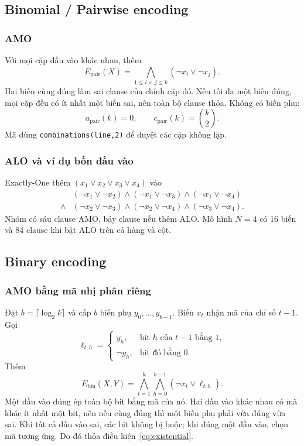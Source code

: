 \subsection{Binomial / Pairwise encoding}
\subsubsection{AMO}
Với mọi cặp đầu vào khác nhau, thêm
\begin{equation}
E_{\mathrm{pair}}(X)=
\bigwedge_{1\le i<j\le k}(\neg x_i\lor\neg x_j).
\end{equation}
Hai biến cùng đúng làm sai clause của chính cặp đó. Nếu tối đa một biến đúng, mọi cặp đều có ít nhất một biến sai, nên toàn bộ clause thỏa. Không có biến phụ:
\begin{equation}
a_{\mathrm{pair}}(k)=0,\qquad
c_{\mathrm{pair}}(k)=\binom{k}{2}.
\end{equation}
Mã dùng \texttt{combinations(line,2)} để duyệt các cặp không lặp.

\subsubsection{ALO và ví dụ bốn đầu vào}
Exactly-One thêm $(x_1\lor x_2\lor x_3\lor x_4)$ vào
\begin{align*}
&(\neg x_1\lor\neg x_2)\land(\neg x_1\lor\neg x_3)
\land(\neg x_1\lor\neg x_4)\\
{}\land{}&(\neg x_2\lor\neg x_3)\land(\neg x_2\lor\neg x_4)
\land(\neg x_3\lor\neg x_4).
\end{align*}
Nhóm có sáu clause AMO, bảy clause nếu thêm ALO. Mô hình $N=4$ có 16 biến và 84 clause khi bật ALO trên cả hàng và cột.

\subsection{Binary encoding}
\subsubsection{AMO bằng mã nhị phân riêng}
Đặt $b=\lceil\log_2 k\rceil$ và cấp $b$ biến phụ $y_0,\ldots,y_{b-1}$. Biến $x_t$ nhận mã của chỉ số $t-1$. Gọi
\begin{equation}
\ell_{t,h}=
\begin{cases}
y_h,&\text{bit }h\text{ của }t-1\text{ bằng }1,\\
\neg y_h,&\text{bit đó bằng }0.
\end{cases}
\end{equation}
Thêm
\begin{equation}
E_{\mathrm{bin}}(X,Y)=
\bigwedge_{t=1}^{k}\bigwedge_{h=0}^{b-1}
(\neg x_t\lor\ell_{t,h}).
\label{eq:binary}
\end{equation}
Một đầu vào đúng ép toàn bộ bit bằng mã của nó. Hai đầu vào khác nhau có mã khác ít nhất một bit, nên nếu cùng đúng thì một biến phụ phải vừa đúng vừa sai. Khi tất cả đầu vào sai, các bit không bị buộc; khi đúng một đầu vào, chọn mã tương ứng. Do đó thỏa điều kiện~\eqref{eq:existential}.

